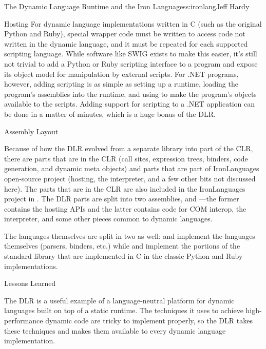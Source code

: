 \begin{aosachapter}{The Dynamic Language Runtime and the Iron Languages}{s:ironlang}{Jeff Hardy}
\begin{aosasect1}{Hosting}
For dynamic language implementations written in C (such as the original Python
and Ruby), special wrapper code must be written to access code not written in
the dynamic language, and it must be repeated for each supported scripting
language. While software like SWIG exists to make this easier, it's still not
trivial to add a Python or Ruby scripting interface to a program and expose its
object model for manipulation by external scripts. For .NET programs, however,
adding scripting is as simple as setting up a runtime, loading the program's
assemblies into the runtime, and using  to make
the program's objects available to the scripts. Adding support for scripting to
a .NET application can be done in a matter of minutes, which is a huge bonus of
the DLR.

\end{aosasect1}

\begin{aosasect1}{Assembly Layout}

Because of how the DLR evolved from a separate library into part of the CLR,
there are parts that are in the CLR (call sites, expression trees, binders,
code generation, and dynamic meta objects) and parts that are part of
IronLanguages open-source project (hosting, the interpreter, and a few other
bits not discussed here). The parts that are in the CLR are also included in
the IronLanguages project in . The DLR parts are
split into two assemblies,  and
---the former contains the hosting APIs and the latter
contains code for COM interop, the interpreter, and some other pieces common to
dynamic languages.

The languages themselves are split in two as well:  and
 implement the languages themselves (parsers, binders, etc.)
while  and  implement
the portions of the standard library that are implemented in C in the classic
Python and Ruby implementations.

\end{aosasect1}

\begin{aosasect1}{Lessons Learned}

The DLR is a useful example of a language-neutral platform for dynamic
languages built on top of a static runtime. The techniques it uses to achieve
high-performance dynamic code are tricky to implement properly, so the DLR
takes these techniques and makes them available to every dynamic language
implementation.


\end{aosasect1}
\end{aosachapter}
